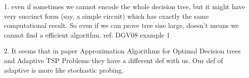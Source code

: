 1. even if sometimes we cannot encode the whole decision tree, but it might have very succinct form (say, a simple circuit) which has exactly the same computational result. So even if we can prove tree size large, doesn't means we cannot find a efficient algorithm. ref: DGV08 example 1

2. It seems that in paper Approximation Algorithms for Optimal Decision trees and Adaptive TSP Problems they have a different def with us. Our def of adaptive is more like stochastic probing.
